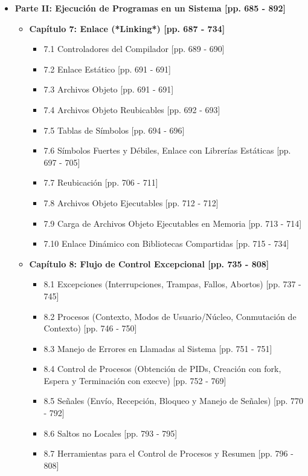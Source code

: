\documentclass[11pt,a4paper]{article}
\begin{document}
\begin{itemize}
    \item \textbf{Parte II: Ejecución de Programas en un Sistema [pp. 685 - 892]}
    \begin{itemize}
        \item \textbf{Capítulo 7: Enlace (*Linking*) [pp. 687 - 734]}
        \begin{itemize}
            \item 7.1 Controladores del Compilador [pp. 689 - 690]
            \item 7.2 Enlace Estático [pp. 691 - 691]
            \item 7.3 Archivos Objeto [pp. 691 - 691]
            \item 7.4 Archivos Objeto Reubicables [pp. 692 - 693]
            \item 7.5 Tablas de Símbolos [pp. 694 - 696]
            \item 7.6 Símbolos Fuertes y Débiles, Enlace con Librerías Estáticas [pp. 697 - 705]
            \item 7.7 Reubicación [pp. 706 - 711]
            \item 7.8 Archivos Objeto Ejecutables [pp. 712 - 712]
            \item 7.9 Carga de Archivos Objeto Ejecutables en Memoria [pp. 713 - 714]
            \item 7.10 Enlace Dinámico con Bibliotecas Compartidas [pp. 715 - 734]
        \end{itemize}
        \item \textbf{Capítulo 8: Flujo de Control Excepcional [pp. 735 - 808]}
        \begin{itemize}
            \item 8.1 Excepciones (Interrupciones, Trampas, Fallos, Abortos) [pp. 737 - 745]
            \item 8.2 Procesos (Contexto, Modos de Usuario/Núcleo, Conmutación de Contexto) [pp. 746 - 750]
            \item 8.3 Manejo de Errores en Llamadas al Sistema [pp. 751 - 751]
            \item 8.4 Control de Procesos (Obtención de PIDs, Creación con fork, Espera y Terminación con execve) [pp. 752 - 769]
            \item 8.5 Señales (Envío, Recepción, Bloqueo y Manejo de Señales) [pp. 770 - 792]
            \item 8.6 Saltos no Locales [pp. 793 - 795]
            \item 8.7 Herramientas para el Control de Procesos y Resumen [pp. 796 - 808]

\end{itemize}
\end{itemize}
\end{itemize}
\end{document}
